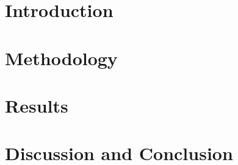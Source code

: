 \newpage

\section{Introduction}
\label{ch:introduction3}


\section{Methodology}
\label{ch:method3}


\section{Results}
\label{ch:results3}




% 

\section{Discussion and Conclusion}
\label{ch:conclusion3}







